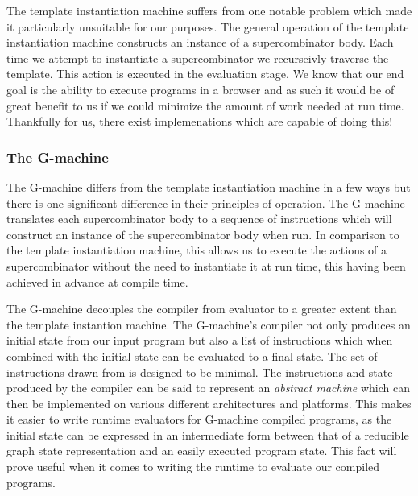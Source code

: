 The template instantiation machine suffers from one notable
problem which made it particularly unsuitable for our
purposes. The general operation of the template instantiation
machine constructs an instance of a supercombinator body.
Each time we attempt to instantiate a supercombinator we
recurseivly traverse the template. This action is executed
in the evaluation stage. We know that our end goal is the
ability to execute programs in a browser and as such it would
be of great benefit to us if we could minimize the amount of
work needed at run time. Thankfully for us, there exist
implemenations which are capable of doing this!

\subsubsection{The G-machine}
The G-machine differs from the template instantiation machine
in a few ways but there is one significant difference in 
their principles of operation. The G-machine translates each
supercombinator body to a sequence of instructions which will
construct an instance of the supercombinator body when run.
In comparison to the template instantiation machine, this
allows us to execute the actions of a supercombinator without
the need to instantiate it at run time, this having been
achieved in advance at compile time. 

The G-machine decouples the compiler from evaluator to a
greater extent than the template instantion machine. The
G-machine's compiler not only produces an initial state from
our input program but also a list of instructions which when
combined with the initial state can be evaluated to a final
state. The set of instructions drawn from is designed to be
minimal. The instructions and state produced
by the compiler can be said to represent an \emph{abstract
machine} which can then be implemented on various different
architectures and platforms. This makes it easier to write
runtime evaluators for G-machine compiled programs, as the
initial state can be expressed in an intermediate form 
between that of a reducible graph state representation 
and an easily executed program state. This fact will prove
useful when it comes to writing the runtime to evaluate
our compiled programs.

